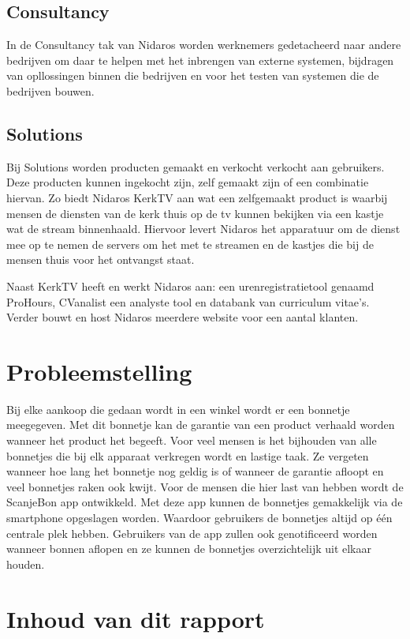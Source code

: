 \documentclass[a4paper,11pt,oneside]{report}
\begin{document}
\subsection{Consultancy}
In de Consultancy tak van Nidaros worden werknemers gedetacheerd naar andere
bedrijven om daar te helpen met het inbrengen van externe systemen, bijdragen
van opllossingen binnen die bedrijven en voor het testen van systemen die de
bedrijven bouwen.
\subsection{Solutions}
Bij Solutions worden producten gemaakt en verkocht verkocht aan gebruikers. Deze
producten kunnen ingekocht zijn, zelf gemaakt zijn of een combinatie hiervan. Zo
biedt Nidaros KerkTV aan wat een zelfgemaakt product is waarbij mensen de
diensten van de kerk thuis op de tv kunnen bekijken via een kastje wat de stream
binnenhaald. Hiervoor levert Nidaros het apparatuur om de dienst mee op te nemen
de servers om het met te streamen en de kastjes die bij de mensen thuis voor het
ontvangst staat.

Naast KerkTV heeft en werkt Nidaros aan: een urenregistratietool genaamd
ProHours, CVanalist een analyste tool en databank van curriculum vitae's. Verder
bouwt en host Nidaros meerdere website voor een aantal klanten.

\section{Probleemstelling}
Bij elke aankoop die gedaan wordt in een winkel wordt er een bonnetje meegegeven. Met dit bonnetje kan de garantie van een product verhaald worden wanneer het product het begeeft. Voor veel mensen is het bijhouden van alle bonnetjes die bij elk apparaat verkregen wordt en lastige taak. Ze vergeten wanneer hoe lang het bonnetje nog geldig is of wanneer de garantie afloopt en veel bonnetjes raken ook kwijt.
Voor de mensen die hier last van hebben wordt de ScanjeBon app ontwikkeld. Met deze app kunnen de bonnetjes gemakkelijk via de smartphone opgeslagen worden. Waardoor gebruikers de bonnetjes altijd op één centrale plek hebben. Gebruikers van de app zullen ook genotificeerd worden wanneer bonnen aflopen en ze kunnen de bonnetjes overzichtelijk uit elkaar houden.

\section{Inhoud van dit rapport}
\lipsum[5]
\end{document}
